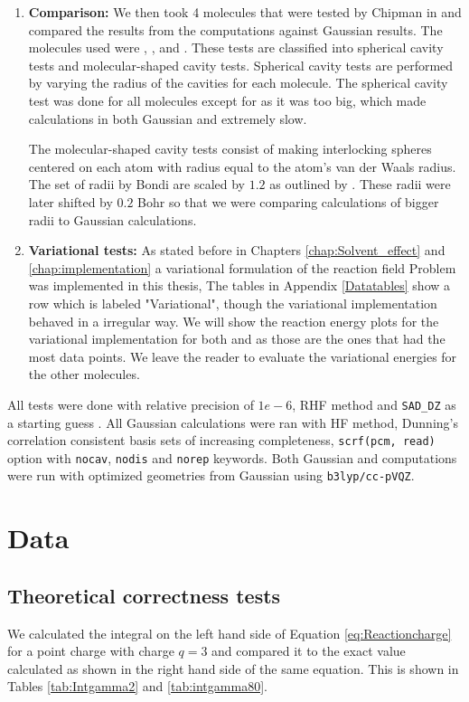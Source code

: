 \documentclass[../master_thesis.tex]{subfiles}
\begin{document}
\begin{enumerate}
\item \textbf{Comparison:} We then took 4 molecules that were tested by Chipman in \cite{Chipman2002} and compared the
results from the computations against Gaussian results. The molecules used
were , ,  and . These tests are classified into
spherical cavity tests and molecular-shaped cavity tests. Spherical cavity tests are performed
by varying the radius of the cavities for each molecule. The spherical cavity test was done for
all molecules except for  as it was too big, which made calculations
in both Gaussian and \mrchem extremely slow.

The molecular-shaped cavity tests consist of making interlocking spheres centered on
each atom with radius equal to the atom's van der Waals radius. The set of radii by
 Bondi \cite{doi:10.1021/j100785a001} are scaled by $1.2$ as outlined by \cite{Tomasi:1994wt}.
 These radii were later shifted by $0.2$ Bohr so that we were comparing
 \mrchem calculations of bigger radii to Gaussian calculations.

\item \textbf{Variational tests:} As stated before in Chapters \ref{chap:Solvent_effect} and \ref{chap:implementation}
a variational formulation of the reaction field Problem was implemented in this thesis,
The tables in Appendix \ref{Datatables} show a row which is labeled "Variational",
though the variational implementation behaved in a irregular way. We will show
the reaction energy plots for the variational implementation for both 
and  as those are the ones that had the most data points. We leave the
reader to evaluate the variational energies for the other molecules.

\end{enumerate}
All \mrchem tests were done with relative precision of $1e-6$, RHF method and \verb!SAD_DZ! as a
starting guess \cite{MRchem}. All Gaussian calculations were ran with \ac{HF} method,  Dunning's correlation
consistent basis sets\cite{doi:10.1063/1.456153} of increasing completeness, \verb!scrf(pcm, read)! option with
\verb!nocav!, \verb!nodis! and  \verb!norep! keywords. Both Gaussian and \mrchem computations were run with
optimized geometries from Gaussian using \verb!b3lyp/cc-pVQZ!.

\section{Data}
\subsection{Theoretical correctness tests}
We calculated the integral on the left hand side of Equation \ref{eq:Reactioncharge} for a point charge
with charge $q=3$ and compared it to the exact value calculated as shown in the right hand side of the same
equation. This is shown in Tables \ref{tab:Intgamma2} and \ref{tab:intgamma80}.
\end{document}
